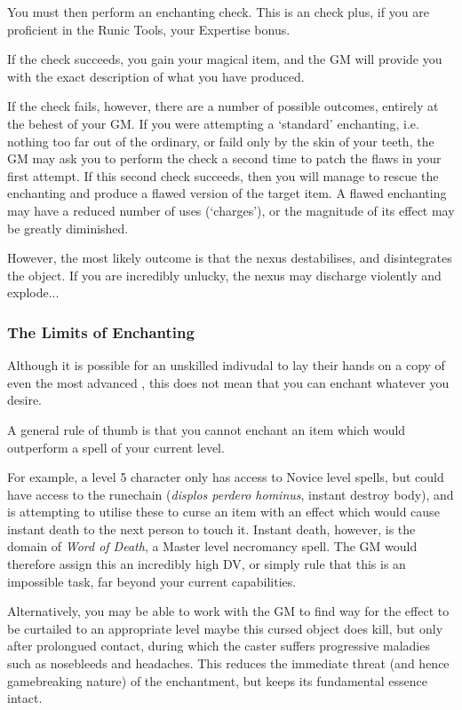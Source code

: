 {You must then perform an enchanting check. This is an \attFin{} check plus, if you are proficient in the Runic Tools, your Expertise bonus. 

If the check succeeds, you gain your magical item, and the GM will provide you with the exact description of what you have produced. 

If the check fails, however, there are a number of possible outcomes, entirely at the behest of your GM. If you were attempting a `standard' enchanting, i.e. nothing too far out of the ordinary, or faild only by the skin of your teeth, the GM may ask you to perform the check a second time to patch the flaws in your first attempt. If this second check succeeds, then you will manage to rescue the enchanting and produce a flawed version of the target item. A flawed enchanting may have a reduced number of uses (`charges'), or the magnitude of its effect may be greatly diminished. 

However, the most likely outcome is that the nexus destabilises, and disintegrates the object. If you are incredibly unlucky, the nexus may discharge violently and explode...

\subsubsection{The Limits of Enchanting}

Although it is possible for an unskilled indivudal to lay their hands on a copy of even the most advanced , this does not mean that you can enchant whatever you desire. 

A general rule of thumb is that you cannot enchant an item which would outperform a spell of your current level. 

For example, a level 5 character only has access to Novice level spells, but could have access to the runechain \rune{\displos\perdero\hominus} ({\it displos perdero hominus}, instant destroy body), and is attempting to utilise these  to curse an item with an effect which would cause instant death to the next person to touch it. Instant death, however, is the domain of {\it Word of Death}, a Master level necromancy spell. The GM would therefore assign this an incredibly high DV, or simply rule that this is an impossible task, far beyond your current capabilities. 

Alternatively, you may be able to work with the GM to find way for the effect to be curtailed to an appropriate level \minus{} maybe this cursed object does kill, but only after prolongued contact, during which the caster suffers progressive maladies such as nosebleeds and headaches. This reduces the immediate threat (and hence game\minus{}breaking nature) of the enchantment, but keeps its fundamental essence intact. 

}
